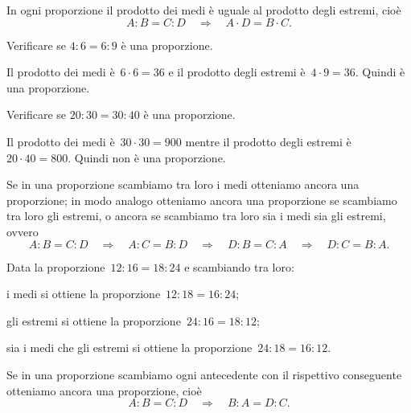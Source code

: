 \begin{proprieta}
  In ogni proporzione il prodotto dei medi è uguale al prodotto degli estremi, cioè
\[A:B=C:D\quad\Rightarrow\quad A\cdot D=B\cdot C.\]
\end{proprieta}

\begin{exrig}
 \begin{esempio}
Verificare se $4:6=6:9$ è una proporzione.

Il prodotto dei medi è~$6\cdot6=36$ e il prodotto degli estremi è~$4\cdot9=36$. Quindi è una proporzione.
 \end{esempio}

\begin{esempio}
Verificare se $20:30=30:40$ è una proporzione.

Il prodotto dei medi è~$30\cdot30=900$ mentre il prodotto degli estremi è~$20\cdot40=800$. Quindi non è una proporzione.
\end{esempio}
\end{exrig}

\begin{proprieta}
  Se in una proporzione scambiamo tra loro i medi otteniamo ancora una proporzione;
in modo analogo otteniamo ancora una proporzione se scambiamo tra loro gli estremi,
o ancora se scambiamo tra loro sia i medi sia gli estremi, ovvero
\[A:B=C:D\quad\Rightarrow\quad A:C=B:D\quad\Rightarrow\quad D:B=C:A\quad\Rightarrow\quad D:C=B:A.\]
\end{proprieta}

\begin{exrig}
 \begin{esempio}
Data la proporzione~$12:16=18:24$ e scambiando tra loro:
\begin{itemize*}
  \item i medi si ottiene la proporzione~$12:18=16:24$;
  \item gli estremi si ottiene la proporzione~$24:16=18:12$;
  \item sia i medi che gli estremi si ottiene la proporzione~$24:18=16:12$.
\end{itemize*}

 \end{esempio}
\end{exrig}


\begin{proprieta}
  Se in una proporzione scambiamo ogni antecedente con il rispettivo conseguente
otteniamo ancora una proporzione, cioè
\[A:B=C:D\quad\Rightarrow\quad B:A=D:C.\]
\end{proprieta}

